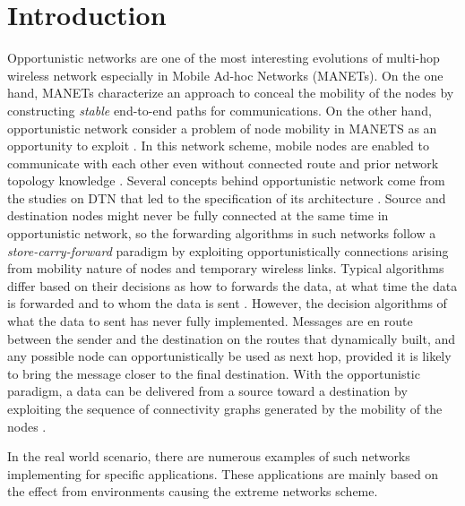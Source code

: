 \chapter{Introduction}
\label{intro}

Opportunistic networks are one of the most interesting evolutions of multi-hop wireless network especially in Mobile Ad-hoc Networks (MANETs).
On the one hand, MANETs characterize an approach to conceal the mobility of the nodes by constructing \emph{stable} end-to-end paths for communications. 
On the other hand, opportunistic network consider a problem of node mobility in MANETS as an opportunity to exploit \cite{Conti2014}.
In this network scheme, mobile nodes are enabled to communicate with each other even without connected route and prior network topology knowledge \cite{Pelusi2006}.
Several concepts behind opportunistic network come from the studies on DTN that led to the specification of its architecture \cite{Conan2008,Yu2012,Rongxing2010,Schurgot2012}. 
Source and destination nodes might never be fully connected at the same time in opportunistic network, so the forwarding algorithms in such networks follow a \emph{store-carry-forward} paradigm \cite{Yamamura2011,Jie2007,Jie2007a} by exploiting opportunistically connections arising from mobility nature of nodes and temporary wireless links. 
Typical algorithms differ based on their decisions as how to forwards the data, at what time the data is forwarded and to whom the data is sent \cite{Joe2010}. 
However, the decision algorithms of what the data to sent has never fully implemented. 
Messages are en route between the sender and the destination on the routes that dynamically built, and any possible node can opportunistically be used as next hop, provided it is likely to bring the message closer to the final destination.
With the opportunistic paradigm, a data can be delivered from a source toward a destination by exploiting the sequence of connectivity graphs generated by the mobility of the nodes \cite{Acer20111,Ferretti2013}.

In the real world scenario, there are numerous examples of such networks implementing for specific applications. 
These applications are mainly based on the effect from environments causing the extreme networks scheme.

